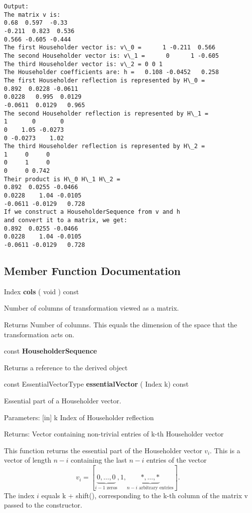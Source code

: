 \begin{verbatim}
Output:
The matrix v is:
0.68  0.597  -0.33
-0.211  0.823  0.536
0.566 -0.605 -0.444
The first Householder vector is: v\_0 =      1 -0.211  0.566
The second Householder vector is: v\_1 =      0      1 -0.605
The third Householder vector is: v\_2 = 0 0 1
The Householder coefficients are: h =   0.108 -0.0452   0.258
The first Householder reflection is represented by H\_0 = 
0.892  0.0228 -0.0611
0.0228   0.995  0.0129
-0.0611  0.0129   0.965
The second Householder reflection is represented by H\_1 = 
1       0       0
0    1.05 -0.0273
0 -0.0273    1.02
The third Householder reflection is represented by H\_2 = 
1     0     0
0     1     0
0     0 0.742
Their product is H\_0 H\_1 H\_2 = 
0.892  0.0255 -0.0466
0.0228    1.04 -0.0105
-0.0611 -0.0129   0.728
If we construct a HouseholderSequence from v and h
and convert it to a matrix, we get:
0.892  0.0255 -0.0466
0.0228    1.04 -0.0105
-0.0611 -0.0129   0.728
\end{verbatim}

\subsection{Member Function Documentation} 

Index \textbf{cols}  ( void  )  const 

Number of columns of transformation viewed as a matrix. 

Returns Number of columns. 
This equals the dimension of the space that the transformation acts on. 


\vspace{0.3cm}
const \textbf{HouseholderSequence}

Returns a reference to the derived object 


\vspace{0.3cm}
const EssentialVectorType \textbf{essentialVector}  ( Index  k)  const 

Essential part of a Householder vector. 

Parameters: [in] k Index of Householder reflection  

Returns: Vector containing non-trivial entries of k-th Householder vector

This function returns the essential part of the Householder vector $v_i$. This is a vector of length $n-i$ containing the last $n-i$ entries of the vector 
\begin{equation}
v_i = [\underbrace{0,\ldots,0}_{i-1 \text{ zeros}}, 1, \underbrace{*,\ldots,*}_{n-i \text{ arbitrary entries}}].
\end{equation}
The index $i$ equals k + shift(), corresponding to the k-th column of the matrix v passed to the constructor.


